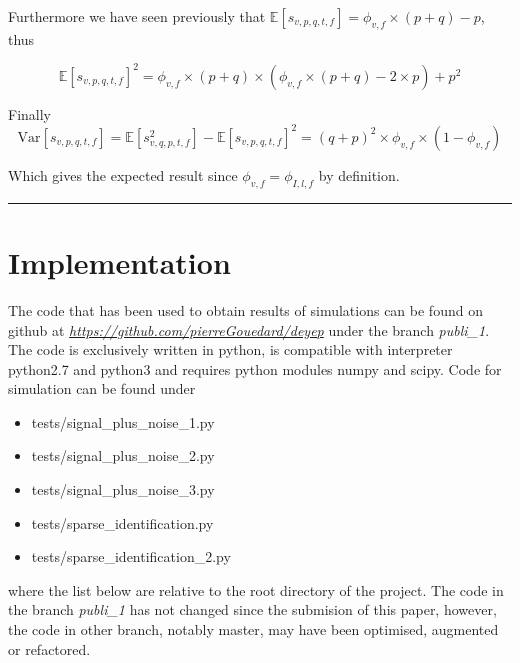 \documentclass[a4paper, 11pt]{article}
\newcommand{\Var}{\mathrm{Var}}
\begin{document}
Furthermore we have seen previously that $\mathbb{E}\left[  s_{v, p, q, t, f}\right] = \phi_{v, f}\times (p + q) - p$, thus

\begin{equation*}
\mathbb{E}\left[  s_{v,p, q, t, f}\right]^{2} = \phi_{v, f}\times (p + q) \times \left( \phi_{v,f}\times (p + q) - 2\times p \right) + p^{2}
\end{equation*}

Finally
\begin{equation*}
\Var \left[ s_{v, p, q, t, f}  \right] = \mathbb{E}\left[  s_{v, q, p, t, f}^{2}\right] - \mathbb{E}\left[  s_{v, p, q, t, f}\right]^{2} = (q + p)^{2} \times \phi_{v, f} \times (1 - \phi_{v, f})
\end{equation*}

Which gives the expected result since $\phi_{v, f} = \phi_{I, l, f}$ by definition.
\begin{center}
\rule[0pt]{100pt}{1pt} 
\end{center}


\section{Implementation}

The code that has been used to obtain results of simulations can be found on github at \href{https://github.com/pierreGouedard/deyep}{\textit{https://github.com/pierreGouedard/deyep}} under the branch \textit{publi\_1}. The code is exclusively written in python, is compatible with interpreter python2.7 and python3 and requires python modules numpy and scipy. Code for simulation can be found under

\begin{itemize}
\item tests/signal\_plus\_noise\_1.py
\item tests/signal\_plus\_noise\_2.py
\item tests/signal\_plus\_noise\_3.py
\item tests/sparse\_identification.py
\item tests/sparse\_identification\_2.py
\end{itemize}

where the list below are relative to the root directory of the project. The code in the branch \textit{publi\_1} has not changed since the submision of this paper, however, the code in other branch, notably master, may have been optimised, augmented or refactored. 


\newpage
{}

\end{document}
